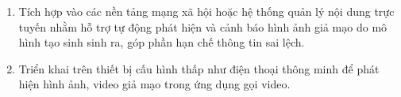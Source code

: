 \begin{enumerate}
	\item Tích hợp vào các nền tảng mạng xã hội hoặc hệ thống quản lý nội dung trực tuyến nhằm hỗ trợ tự động phát hiện và cảnh báo hình ảnh giả mạo do mô hình tạo sinh sinh ra, góp phần hạn chế thông tin sai lệch.
	
	\item Triển khai trên thiết bị cấu hình thấp như điện thoại thông minh để phát hiện hình ảnh, video giả mạo trong ứng dụng gọi video.
	
\end{enumerate}
%
%


